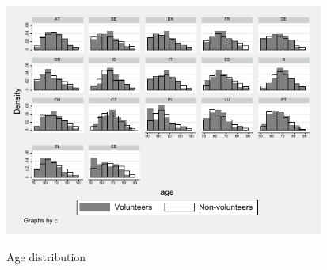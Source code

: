 \documentclass[10pt, letterpaper]{article}
\begin{document}
\begin{spacing}{1.4}
\begin{spacing}{.9}
 
\begin{spacing}{.9}
\centering 
\begin{scriptsize} 
	 
      \label{DescT0} 
\end{scriptsize}
\end{spacing}

\begin{spacing}{.9}
\centering 
\begin{scriptsize} 
	 
      \label{DescT1} 
\end{scriptsize}
\end{spacing}

\begin{figure}[H]
 \includegraphics[height=3in]{hist_age.pdf}
 \centering
 \label{fig:hist_age}
\caption{Age distribution}
\end{figure}



\end{spacing}
\end{spacing}
\end{document}
